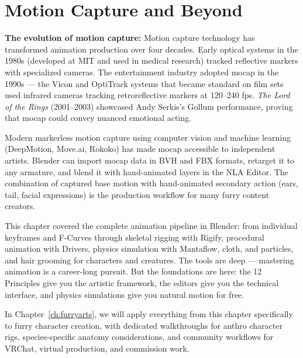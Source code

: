 \section{Motion Capture and Beyond}
\label{sec:mocap}

\begin{historynote}
\textbf{The evolution of motion capture:} Motion capture technology has transformed animation production over four decades. Early optical systems in the 1980s (developed at MIT and used in medical research) tracked reflective markers with specialized cameras. The entertainment industry adopted mocap in the 1990s --- the Vicon and OptiTrack systems that became standard on film sets used infrared cameras tracking retroreflective markers at 120--240 fps. \textit{The Lord of the Rings} (2001--2003) showcased Andy Serkis's Gollum performance, proving that mocap could convey nuanced emotional acting.

Modern markerless motion capture using computer vision and machine learning (DeepMotion, Move.ai, Rokoko) has made mocap accessible to independent artists. Blender can import mocap data in BVH and FBX formats, retarget it to any armature, and blend it with hand-animated layers in the NLA Editor. The combination of captured base motion with hand-animated secondary action (ears, tail, facial expressions) is the production workflow for many furry content creators.
\end{historynote}

\vspace{2em}

This chapter covered the complete animation pipeline in Blender: from individual keyframes and F-Curves through skeletal rigging with Rigify, procedural animation with Drivers, physics simulation with Mantaflow, cloth, and particles, and hair grooming for characters and creatures. The tools are deep --- mastering animation is a career-long pursuit. But the foundations are here: the 12 Principles give you the artistic framework, the editors give you the technical interface, and physics simulations give you natural motion for free.

In Chapter~\ref{ch:furryarts}, we will apply everything from this chapter specifically to furry character creation, with dedicated walkthroughs for anthro character rigs, species-specific anatomy considerations, and community workflows for VRChat, virtual production, and commission work.
